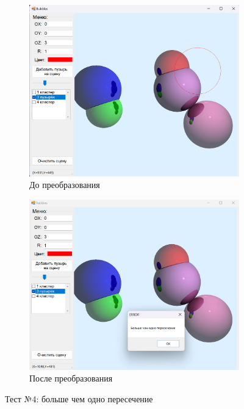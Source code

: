 \begin{figure}[h]
	\centering
	\begin{subfigure}{0.45\textwidth}
		\includegraphics[width=\linewidth]{pictures/test4_1.png}
		\caption{До преобразования}
		\label{fig:4first}
	\end{subfigure}
	\hfill
	\begin{subfigure}{0.45\textwidth}
		\includegraphics[width=\linewidth]{pictures/test4_2.png}
		\caption{После преобразования}
		\label{fig:4second}
	\end{subfigure}
	\caption{Тест №4: больше чем одно пересечение}
	\label{fig:test4}
\end{figure}
